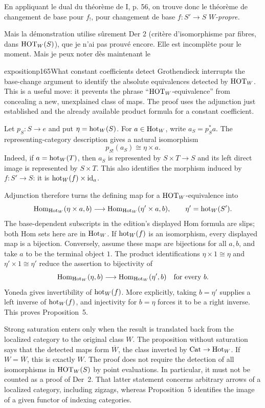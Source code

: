 En appliquant le dual du théorème de I, p. 56, on trouve donc le théorème de changement de base pour $f_!$, pour changement de base $f : S' \longrightarrow S$ \textit{$W$-propre.}

\marginpar{$\Vert$}Mais la démonstration utilise sûrement Der 2 (critère d'isomorphisme par fibres, dans $\mathrm{HOT}_W(S)$), que je n'ai pas prouvé encore. Elle est incomplète pour le moment. Mais je peux noter dès maintenant le

\begin{dcomment}{exposition}{p165}{What constant coefficients detect}
Grothendieck interrupts the base-change argument to identify the absolute equivalences detected by $\mathrm{HOT}_W$. This is a useful move: it prevents the phrase ``$\mathrm{HOT}_W$-equivalence'' from concealing a new, unexplained class of maps. The proof uses the adjunction just established and the already available product formula for a constant coefficient.

Let $p_S:S\to e$ and put $\eta=\mathrm{hot}_W(S)$. For $a\in\mathrm{Hot}_W$, write $a_S=p_S^*a$. The representing-category description gives a natural isomorphism
\[
 p_{S!}(a_S)\cong\eta\times a.
\]
Indeed, if $a=\mathrm{hot}_W(T)$, then $a_S$ is represented by $S\times T\to S$ and its left direct image is represented by $S\times T$. This also identifies the morphism induced by $f:S'\to S$: it is $\mathrm{hot}_W(f)\times\mathrm{id}_a$.

Adjunction therefore turns the defining map for a $\mathrm{HOT}_W$-equivalence into
\[
 \mathrm{Hom}_{\mathrm{Hot}_W}(\eta\times a,b)
 \longrightarrow
 \mathrm{Hom}_{\mathrm{Hot}_W}(\eta'\times a,b),
 \qquad \eta'=\mathrm{hot}_W(S').
\]
The base-dependent subscripts in the edition's displayed Hom formula are slips; both Hom sets here are in $\mathrm{Hot}_W$. If $\mathrm{hot}_W(f)$ is an isomorphism, every displayed map is a bijection. Conversely, assume these maps are bijections for all $a,b$, and take $a$ to be the terminal object $1$. The product identifications $\eta\times1\cong\eta$ and $\eta'\times1\cong\eta'$ reduce the assertion to bijectivity of
\[
 \mathrm{Hom}_{\mathrm{Hot}_W}(\eta,b)\longrightarrow\mathrm{Hom}_{\mathrm{Hot}_W}(\eta',b)
 \quad\hbox{for every }b.
\]
Yoneda gives invertibility of $\mathrm{hot}_W(f)$. More explicitly, taking $b=\eta'$ supplies a left inverse of $\mathrm{hot}_W(f)$, and injectivity for $b=\eta$ forces it to be a right inverse. This proves Proposition~5.

Strong saturation enters only when the result is translated back from the localized category to the original class $W$. The proposition without saturation says that the detected maps form $\overline W$, the class inverted by $\mathrm{Cat}\to\mathrm{Hot}_W$. If $W=\overline W$, this is exactly $W$. The proof does not require the detection of all isomorphisms in $\mathrm{HOT}_W(S)$ by point evaluations. In particular, it must not be counted as a proof of Der~2. That latter statement concerns arbitrary arrows of a localized category, including zigzags, whereas Proposition~5 identifies the image of a given functor of indexing categories.


\end{dcomment}
